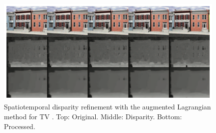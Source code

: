 \begin{figure}[h!]
  \centering
  \includegraphics[width=1.0\textwidth]{src/images/spatiotemporal.png}
  \caption[Spatiotemporal disparity refinement with the augmented Lagrangian method for TV]{Spatiotemporal disparity refinement with the augmented Lagrangian method for TV \citep{khoshabeh2011spatio}. Top: Original. Middle: Disparity. Bottom: Processed.}
  \label{fig:spatiotemporal}
\end{figure}

